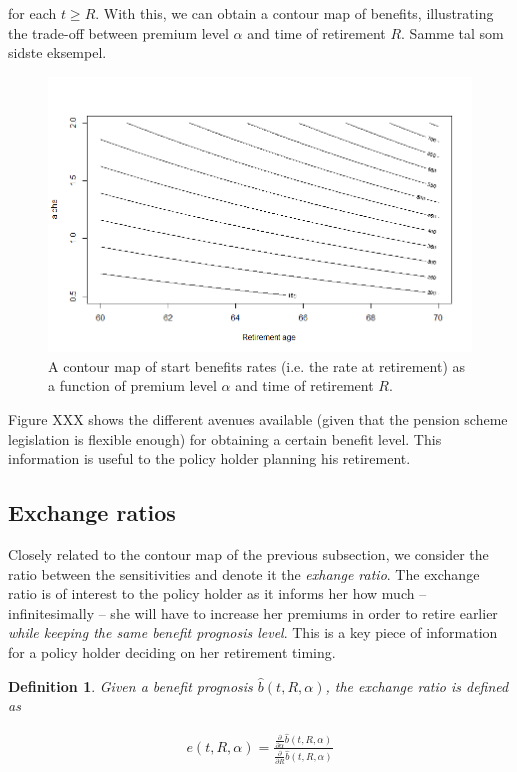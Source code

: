 \documentclass{book}
\newcommand{\1}[1]{\mathbbm{1}_{\left\lbrace #1 \right\rbrace}}
\theoremstyle{break}
\newtheorem{definition}{Definition}%
\theoremstyle{remark}
\numberwithin{equation}{section}
\begin{document}
for each $t \geq R$. With this, we can obtain a contour map of benefits, illustrating the trade-off between premium level $\alpha$ and time of retirement $R$. Samme tal som sidste eksempel.

\begin{figure}[H] \label{ContourGraph}
	\centering
	\caption{A contour map of start benefits rates (i.e. the rate at retirement) as a function of premium level $\alpha$ and time of retirement $R$.}
	\includegraphics[width=\textwidth]{Contour}		
\end{figure}

Figure XXX shows the different avenues available (given that the pension scheme legislation is flexible enough) for obtaining a certain benefit level. This information is useful to the policy holder planning his retirement.

\subsection{Exchange ratios}

Closely related to the contour map of the previous subsection, we consider the ratio between the sensitivities and denote it the \textit{exhange ratio}. The exchange ratio is of interest to the policy holder as it informs her how much -- infinitesimally -- she will have to increase her premiums in order to retire earlier \textit{while keeping the same benefit prognosis level}. This is a key piece of information for a policy holder deciding on her retirement timing.

\begin{definition}
	Given a benefit prognosis $\hat{b}(t,R,\alpha)$, the exchange ratio is defined as
	
\begin{align*}
	e(t,R,\alpha) = \frac{\frac{\partial}{\partial \alpha }\hat{b}(t,R,\alpha)}{\frac{\partial}{\partial R }\hat{b}(t,R,\alpha)}
\end{align*}
\end{definition}
\end{document}
